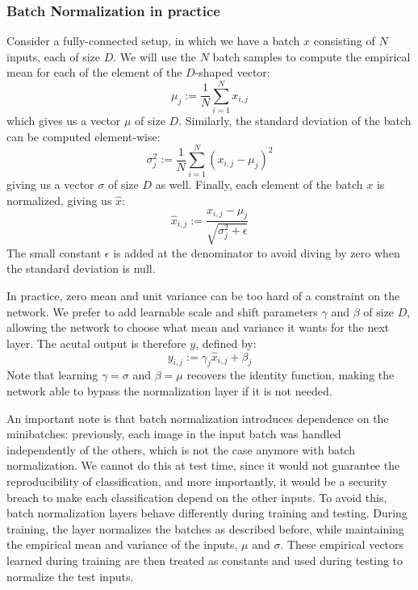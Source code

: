 \subsubsection{Batch Normalization in practice}
Consider a fully-connected setup, in which we have a batch $x$ consisting of $N$ inputs, each of size $D$. We will use the $N$ batch samples to compute the empirical mean for each of the element of the $D$-shaped vector:
\begin{equation*}
    \mu_j := \frac{1}{N}\sum_{i=1}^N x_{i, j}
\end{equation*}
which gives us a vector $\mu$ of size $D$. Similarly, the standard deviation of the batch can be computed element-wise:
\begin{equation*}
    \sigma_j^2 := \frac{1}{N}\sum_{i=1}^N (x_{i,j}-\mu_j)^2
\end{equation*}
giving us a vector $\sigma$ of size $D$ as well. Finally, each element of the batch $x$ is normalized, giving us $\hat{x}$:
\begin{equation*}
    \hat{x}_{i,j} := \frac{x_{i,j}-\mu_j}{\sqrt{\sigma^2_j+\epsilon}}
\end{equation*}
The small constant $\epsilon$ is added at the denominator to avoid diving by zero when the standard deviation is null.

In practice, zero mean and unit variance can be too hard of a constraint on the network. We prefer to add learnable scale and shift parameters $\gamma$ and $\beta$ of size $D$, allowing the network to choose what mean and variance it wants for the next layer. The acutal output is therefore $y$, defined by:
\begin{equation*}
    y_{i,j} := \gamma_j\hat{x}_{i,j}+\beta_j
\end{equation*}
Note that learning $\gamma=\sigma$ and $\beta=\mu$ recovers the identity function, making the network able to bypass the normalization layer if it is not needed.

An important note is that batch normalization introduces dependence on the minibatches: previously, each image in the input batch was handled independently of the others, which is not the case anymore with batch normalization. We cannot do this at test time, since it would not guarantee the reproducibility of classification, and more importantly, it would be a security breach to make each classification depend on the other inputs. To avoid this, batch normalization layers behave differently during training and testing. During training, the layer normalizes the batches as described before, while maintaining the empirical mean and variance of the inputs, $\mu$ and $\sigma$. These empirical vectors learned during training are then treated as constants and used during testing to normalize the test inputs.

